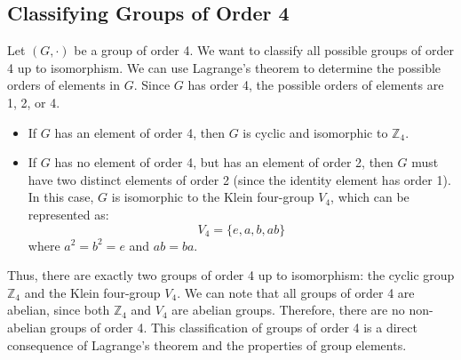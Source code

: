 \documentclass[openany]{book}
\begin{document}
\subsection{Classifying Groups of Order 4}
Let $(G, \cdot)$ be a group of order 4. We want to classify all possible groups of order 4 up to isomorphism. We can use Lagrange's theorem to determine the possible orders of elements in \( G \). Since \( G \) has order 4, the possible orders of elements are 1, 2, or 4.
\begin{itemize}
    \item If \( G \) has an element of order 4, then \( G \) is cyclic and isomorphic to \( \mathbb{Z}_4 \).
    \item If \( G \) has no element of order 4, but has an element of order 2, then \( G \) must have two distinct elements of order 2 (since the identity element has order 1). In this case, \( G \) is isomorphic to the Klein four-group \( V_4 \), which can be represented as:
    \[
    V_4 = \{ e, a, b, ab \}
    \]
    where \( a^2 = b^2 = e \) and \( ab = ba \).    
\end{itemize}
Thus, there are exactly two groups of order 4 up to isomorphism: the cyclic group \( \mathbb{Z}_4 \) and the Klein four-group \( V_4 \). We can note that all groups of order 4 are abelian, since both \( \mathbb{Z}_4 \) and \( V_4 \) are abelian groups. Therefore, there are no non-abelian groups of order 4. This classification of groups of order 4 is a direct consequence of Lagrange's theorem and the properties of group elements.
\end{document}

